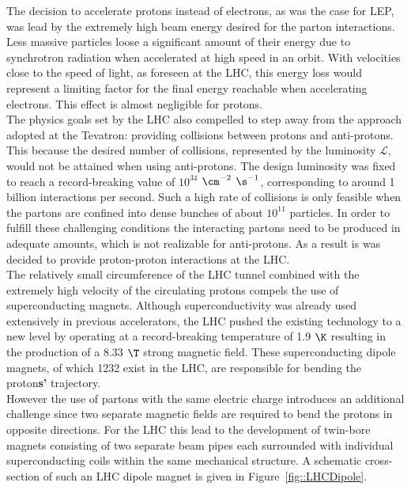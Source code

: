 The decision to accelerate protons instead of electrons, as was the case for LEP, was lead by the extremely high beam energy desired for the parton interactions. Less massive particles loose a significant amount of their energy due to synchrotron radiation when accelerated at high speed in an orbit. With velocities close to the speed of light, as foreseen at the LHC, this energy loss would represent a limiting factor for the final energy reachable when accelerating electrons. This effect is almost negligible for protons.
\\
The physics goals set by the LHC also compelled to step away from the approach adopted at the Tevatron: providing collisions between protons and anti-protons. This because the desired number of collisions, represented by the luminosity $\mathcal{L}$, would not be attained when using anti-protons. The design luminosity was fixed to reach a record-breaking value of $10^{34}$ $\cm^{-2}$ $\s^{-1}$, corresponding to around 1 billion interactions per second. Such a high rate of collisions is only feasible when the partons are confined into dense bunches of about $10^{11}$ particles.
In order to fulfill these challenging conditions the interacting partons need to be produced in adequate amounts, which is not realizable for anti-protons.
As a result is was decided to provide proton-proton interactions at the LHC.
\\
The relatively small circumference of the LHC tunnel combined with the extremely high velocity of the circulating protons compels the use of superconducting magnets. Although superconductivity was already used extensively in previous accelerators, the LHC pushed the existing technology to a new level by operating at a record-breaking temperature of 1.9 $\K$ resulting in the production of a 8.33 $\T$ strong magnetic field. 
These superconducting dipole magnets, of which 1232 exist in the LHC, are responsible for bending the proton\textbf{s'} trajectory.
\\
However the use of partons with the same electric charge introduces an additional challenge since two separate magnetic fields are required to bend the protons in opposite directions. For the LHC this lead to the development of twin-bore magnets consisting of two separate beam pipes each surrounded with individual superconducting coils within the same mechanical structure.
A schematic cross-section of such an LHC dipole magnet is given in Figure~\ref{fig::LHCDipole}.
